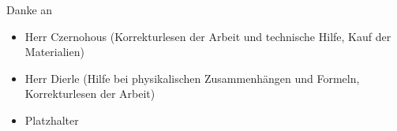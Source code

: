 Danke an \\
\begin{itemize}
    \item Herr Czernohous (Korrekturlesen der Arbeit und technische Hilfe, Kauf der Materialien)
    \item Herr Dierle (Hilfe bei physikalischen Zusammenhängen und Formeln, Korrekturlesen der Arbeit)
    \item Platzhalter
\end{itemize}